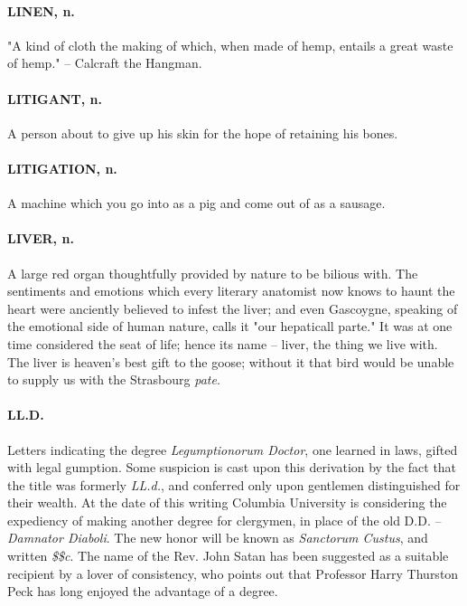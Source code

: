 \documentclass[11pt]{article}
\begin{document}
\paragraph{LINEN, n.}  "A kind of cloth the making of which, when made of hemp,
entails a great waste of hemp." -- Calcraft the Hangman.

\paragraph{LITIGANT, n.}  A person about to give up his skin for the hope of
retaining his bones.

\paragraph{LITIGATION, n.}  A machine which you go into as a pig and come out of
as a sausage.

\paragraph{LIVER, n.}  A large red organ thoughtfully provided by nature to be
bilious with.  The sentiments and emotions which every literary
anatomist now knows to haunt the heart were anciently believed to
infest the liver; and even Gascoygne, speaking of the emotional side
of human nature, calls it "our hepaticall parte."  It was at one time
considered the seat of life; hence its name -- liver, the thing we
live with.  The liver is heaven's best gift to the goose; without it
that bird would be unable to supply us with the Strasbourg {\em pate}.

\paragraph{LL.D.}  Letters indicating the degree {\em Legumptionorum Doctor}, one
learned in laws, gifted with legal gumption.  Some suspicion is cast
upon this derivation by the fact that the title was formerly {\em LL.d.},
and conferred only upon gentlemen distinguished for their wealth.  At
the date of this writing Columbia University is considering the
expediency of making another degree for clergymen, in place of the old
D.D. -- {\em Damnator Diaboli}.  The new honor will be known as {\em Sanctorum
Custus}, and written {\em \$\$c}.  The name of the Rev. John Satan has been
suggested as a suitable recipient by a lover of consistency, who
points out that Professor Harry Thurston Peck has long enjoyed the
advantage of a degree.
\end{document}
